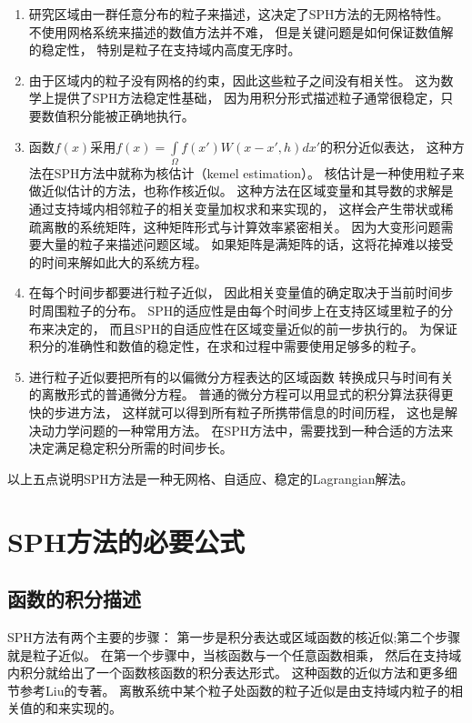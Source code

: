 \begin{enumerate}
\item 研究区域由一群任意分布的粒子来描述，这决定了SPH方法的无网格特性。
不使用网格系统来描述的数值方法并不难，
但是关键问题是如何保证数值解的稳定性，
特别是粒子在支持域内高度无序时。

\item 由于区域内的粒子没有网格的约束，因此这些粒子之间没有相关性。
这为数学上提供了SPH方法稳定性基础，
因为用积分形式描述粒子通常很稳定，只要数值积分能被正确地执行。

\item 函数$f(x)$采用$f(x)=\int\limits_\Omega{}f(x')W(x-x',h)dx'$的积分近似表达，
这种方法在SPH方法中就称为核估计（kemel estimation）。
核估计是一种使用粒子来做近似估计的方法，也称作核近似。
这种方法在区域变量和其导数的求解是通过支持域内相邻粒子的相关变量加权求和来实现的，
这样会产生带状或稀疏离散的系统矩阵，这种矩阵形式与计算效率紧密相关。
因为大变形问题需要大量的粒子来描述问题区域。
如果矩阵是满矩阵的话，这将花掉难以接受的时间来解如此大的系统方程。

\item 在每个时间步都要进行粒子近似，
因此相关变量值的确定取决于当前时间步时周围粒子的分布。
SPH的适应性是由每个时间步上在支持区域里粒子的分布来决定的，
而且SPH的自适应性在区域变量近似的前一步执行的。
为保证积分的准确性和数值的稳定性，在求和过程中需要使用足够多的粒子。

\item 进行粒子近似要把所有的以偏微分方程表达的区域函数
转换成只与时间有关的离散形式的普通微分方程。
普通的微分方程可以用显式的积分算法获得更快的步进方法，
这样就可以得到所有粒子所携带信息的时间历程，
这也是解决动力学问题的一种常用方法。
在SPH方法中，需要找到一种合适的方法来决定满足稳定积分所需的时间步长。

\end{enumerate}\qquad{}
以上五点说明SPH方法是一种无网格、自适应、稳定的Lagrangian解法。

\section{SPH方法的必要公式}
\label{sec:sph-base-equ}

\subsection{函数的积分描述}
\label{subsec:fun-int-equ}

SPH方法有两个主要的步骤：
第一步是积分表达或区域函数的核近似;第二个步骤就是粒子近似。
在第一个步骤中，当核函数与一个任意函数相乘，
然后在支持域内积分就给出了一个函数核函数的积分表达形式。
这种函数的近似方法和更多细节参考Liu的专著。
离散系统中某个粒子处函数的粒子近似是由支持域内粒子的相关值的和来实现的。

